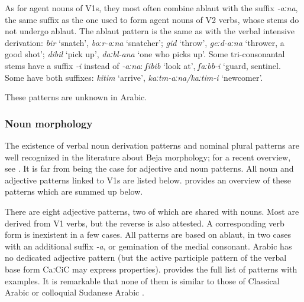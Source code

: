 \documentclass[output=paper]{langsci/langscibook}
\begin{document}
As for agent nouns of V1s, they most often combine ablaut with the suffix \textit{\nobreakdash-aːna}, the same suffix as the one used to form agent nouns of V2 verbs, whose stems do not undergo ablaut. The ablaut pattern is the same as with the verbal intensive derivation: \textit{bir} ‘snatch’, \textit{boːr-aːna} ‘snatcher’; \textit{gid} ‘throw’,\textbf{ }\textit{geːd-aːna} ‘thrower, a good shot’; \textit{dibil} ‘pick up’, \textit{daːbl-ana} ‘one who picks up’. Some tri-consonantal stems have a suffix \textit{{}-i} instead of \textit{\nobreakdash-aːna}:  \textit{ʃibib} ‘look at’, \textit{ʃaːbb\nobreakdash-i} ‘guard, sentinel. Some have both suffixes: \textit{kitim} ‘arrive’, \textit{kaːtm-aːna/kaːtim-i} ‘newcomer’.

These patterns are unknown in Arabic.
 \subsubsection{Noun morphology}

The existence of verbal noun derivation patterns and nominal plural patterns are well recognized in the literature about Beja morphology; for a recent overview, see \citet{Appleyard2007}. It is far from being the case for adjective and noun patterns. All noun and adjective patterns linked to V1s are listed below. \citet{Vanhove2012} provides an overview of these patterns which are summed up below.

There are eight adjective patterns, two of which are shared with nouns. Most are derived from V1 verbs, but the reverse is also attested. A corresponding verb form is inexistent in a few cases. All patterns are based on ablaut, in two cases with an additional suffix \textit{\nobreakdash-a}, or gemination of the medial consonant. Arabic has no dedicated adjective pattern (but the active participle pattern of the verbal base form CaːCiC may express properties).  provides the full list of patterns with examples. It is remarkable that none of them is similar to those of Classical Arabic or colloquial Sudanese Arabic \citep[17]{Bergman2002}.
\end{document}
